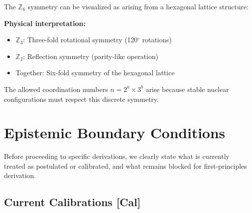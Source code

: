 \documentclass[11pt,a4paper]{article}
\begin{document}
The $\mathbb{Z}_6$ symmetry can be visualized as arising from a hexagonal lattice structure:

\begin{center}
\end{center}

\textbf{Physical interpretation:}
\begin{itemize}
    \item $\mathbb{Z}_3$: Three-fold rotational symmetry (120$^\circ$ rotations)
    \item $\mathbb{Z}_2$: Reflection symmetry (parity-like operation)
    \item Together: Six-fold symmetry of the hexagonal lattice
\end{itemize}

The allowed coordination numbers $n = 2^a \times 3^b$ arise because stable nuclear configurations must respect this discrete symmetry.

\section{Epistemic Boundary Conditions}
\label{sec:epistemic_boundary}

Before proceeding to specific derivations, we clearly state what is currently treated as postulated or calibrated, and what remains blocked for first-principles derivation.

\subsection{Current Calibrations [Cal]}
\end{document}
